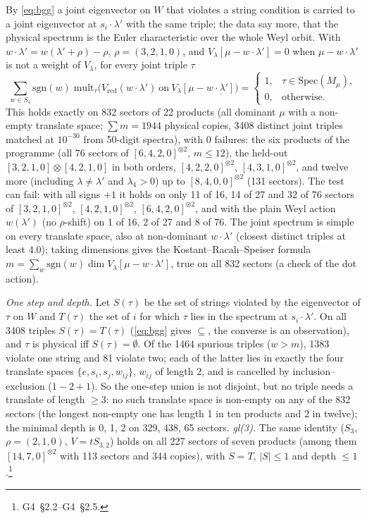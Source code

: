 \documentclass[11pt]{article}
\newcommand{\rg}[2]{\textsf{G#1}~\S#2}
\begin{document}
By \eqref{eq:bgg} a joint eigenvector on $W$ that violates a string condition is carried to a joint eigenvector at $s_i\cdot\lambda'$ with the same triple; the data say more, that the physical spectrum is the Euler characteristic over the whole Weyl orbit.
With $w\cdot\lambda'=w(\lambda'+\rho)-\rho$, $\rho=(3,2,1,0)$, and $V_\lambda[\mu-w\cdot\lambda']=0$ when $\mu-w\cdot\lambda'$ is not a weight of $V_\lambda$, for every joint triple $\tau$
\begin{equation}\label{eq:weyl}
\sum_{w\in S_4}\mathrm{sgn}(w)\;\mathrm{mult}_\tau\big(V_{\mathrm{red}}(w\cdot\lambda')\ \text{on}\ V_\lambda[\mu-w\cdot\lambda']\big)=\begin{cases}1,&\tau\in\mathrm{Spec}(M_\mu),\\0,&\text{otherwise.}\end{cases}
\end{equation}
This holds exactly on 832 sectors of 22 products (all dominant $\mu$ with a non-empty translate space; $\sum m=1944$ physical copies, 3408 distinct joint triples matched at $10^{-30}$ from 50-digit spectra), with 0 failures: the six products of the programme (all 76 sectors of $[6,4,2,0]^{\otimes2}$, $m\le12$), the held-out $[3,2,1,0]\otimes[4,2,1,0]$ in both orders, $[4,2,2,0]^{\otimes2}$, $[4,3,1,0]^{\otimes2}$, and twelve more (including $\lambda\ne\lambda'$ and $\lambda_4>0$) up to $[8,4,0,0]^{\otimes2}$ (131 sectors).
The test can fail: with all signs $+1$ it holds on only 11 of 16, 14 of 27 and 32 of 76 sectors of $[3,2,1,0]^{\otimes2}$, $[4,2,1,0]^{\otimes2}$, $[6,4,2,0]^{\otimes2}$, and with the plain Weyl action $w(\lambda')$ (no $\rho$-shift) on 1 of 16, 2 of 27 and 8 of 76.
The joint spectrum is simple on every translate space, also at non-dominant $w\cdot\lambda'$ (closest distinct triples at least 4.0); taking dimensions gives the Kostant--Racah--Speiser formula $m=\sum_w\mathrm{sgn}(w)\dim V_\lambda[\mu-w\cdot\lambda']$, true on all 832 sectors (a check of the dot action).

\emph{One step and depth.} Let $S(\tau)$ be the set of strings violated by the eigenvector of $\tau$ on $W$ and $T(\tau)$ the set of $i$ for which $\tau$ lies in the spectrum at $s_i\cdot\lambda'$.
On all 3408 triples $S(\tau)=T(\tau)$ (\eqref{eq:bgg} gives $\subseteq$, the converse is an observation), and $\tau$ is physical iff $S(\tau)=\emptyset$.
Of the 1464 spurious triples ($w>m$), 1383 violate one string and 81 violate two; each of the latter lies in exactly the four translate spaces $\{e,s_i,s_j,w_{ij}\}$, $w_{ij}$ of length 2, and is cancelled by inclusion--exclusion ($1-2+1$).
So the one-step union is not disjoint, but no triple needs a translate of length $\ge3$: no such translate space is non-empty on any of the 832 sectors (the longest non-empty one has length 1 in ten products and 2 in twelve); the minimal depth is 0, 1, 2 on 329, 438, 65 sectors.
\emph{gl(3).} The same identity ($S_3$, $\rho=(2,1,0)$, $V=tS_{3,2}$) holds on all 227 sectors of seven products (among them $[14,7,0]^{\otimes2}$ with 113 sectors and 344 copies), with $S=T$, $|S|\le1$ and depth $\le1$.\footnote{\rg{4}{2.2}--\rg{4}{2.5}.}
\end{document}
